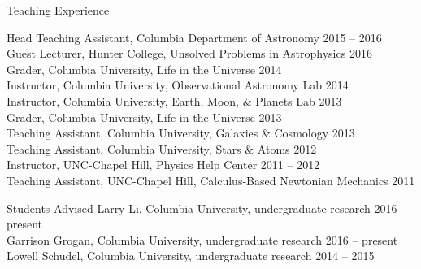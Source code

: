 \documentclass{resume_clark} %
\begin{document}
\begin{rSection}{Teaching Experience}

Head Teaching Assistant, Columbia Department of Astronomy \hfill {2015 -- 2016}\\
Guest Lecturer, Hunter College, Unsolved Problems in Astrophysics \hfill {2016} \\
Grader, Columbia University, Life in the Universe \hfill {2014}\\
Instructor, Columbia University, Observational Astronomy Lab \hfill {2014}\\
Instructor, Columbia University, Earth, Moon, \& Planets Lab \hfill {2013}\\
Grader, Columbia University, Life in the Universe \hfill {2013}\\
Teaching Assistant, Columbia University, Galaxies \& Cosmology \hfill {2013}\\
Teaching Assistant, Columbia University, Stars \& Atoms \hfill {2012}\\
Instructor, UNC-Chapel Hill, Physics Help Center \hfill {2011 -- 2012}\\
Teaching Assistant, UNC-Chapel Hill, Calculus-Based Newtonian Mechanics \hfill {2011}

\end{rSection}


\begin{rSection}{Students Advised}
Larry Li, Columbia University, undergraduate research \hfill{2016 -- present}\\
Garrison Grogan, Columbia University, undergraduate research \hfill{2016 -- present}\\
Lowell Schudel, Columbia University, undergraduate research \hfill{2014 -- 2015}
\end{rSection}

\end{document}
